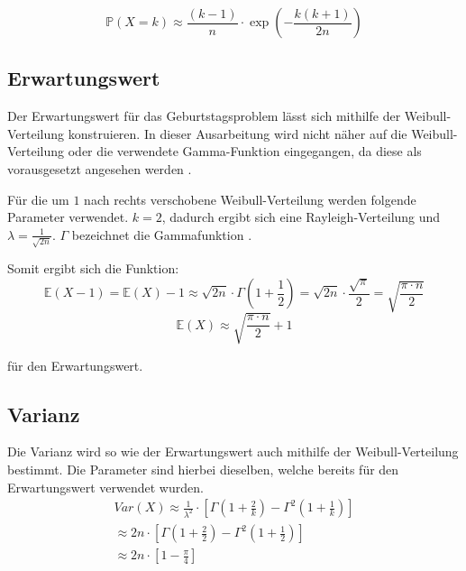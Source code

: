 \documentclass[../main.tex]{subfiles}
\begin{document}
\begin{flushleft}
\begin{equation}
\mathbb{P}(X = k) \approx \frac{ (k-1) }{ n } \cdot \exp( - \frac{ k (k + 1) }{ 2n } )
\end{equation}

 \subsection{Erwartungswert}

Der Erwartungswert für das Geburtstagsproblem lässt sich mithilfe der Weibull-Verteilung konstruieren.
In dieser Ausarbeitung wird nicht näher auf die Weibull-Verteilung oder die verwendete Gamma-Funktion eingegangen, da diese als vorausgesetzt angesehen werden \cite{rinne}.  \newline

Für die um $1$ nach rechts verschobene Weibull-Verteilung werden folgende Parameter verwendet. $k = 2$, dadurch ergibt sich eine Rayleigh-Verteilung und $\lambda = \frac{ 1 }{ \sqrt{2n} }$.
$\Gamma$ bezeichnet die Gammafunktion \cite{rinne}. \newline

Somit ergibt sich die Funktion:
\begin{equation}
\mathbb{E}(X - 1) = \mathbb{E}(X) - 1 \approx \sqrt{ 2n } \cdot \Gamma (1 + \frac{ 1 }{ 2 } ) = \sqrt{ 2n } \cdot \frac{ \sqrt{ \pi } }{ 2 } = \sqrt{ \frac{ \pi \cdot n }{ 2 } }
\end{equation}
\begin{equation}
\mathbb{E}(X) \approx \sqrt{ \frac{ \pi \cdot n }{ 2 } } + 1
\end{equation}

für den Erwartungswert.

 \subsection{Varianz}

Die Varianz wird so wie der Erwartungswert auch mithilfe der Weibull-Verteilung bestimmt. Die Parameter sind hierbei dieselben, welche bereits für den Erwartungswert verwendet wurden\cite{rinne}.
\begin{eqnarray}
Var(X) \approx \frac{ 1 }{ \lambda^{ 2 } } \cdot [\Gamma (1+\frac{ 2 }{ k }) - \Gamma^{ 2 }(1+\frac{ 1 }{ k } )]   \label{eq:08}\\
\approx 2n \cdot [\Gamma(1+\frac{ 2 }{ 2 }) - \Gamma^{ 2 }(1+\frac{ 1 }{ 2 } )] \\
\approx 2n \cdot [1 - \frac{ \pi }{ 4 }]
\end{eqnarray}


\end{flushleft}
\end{document}
